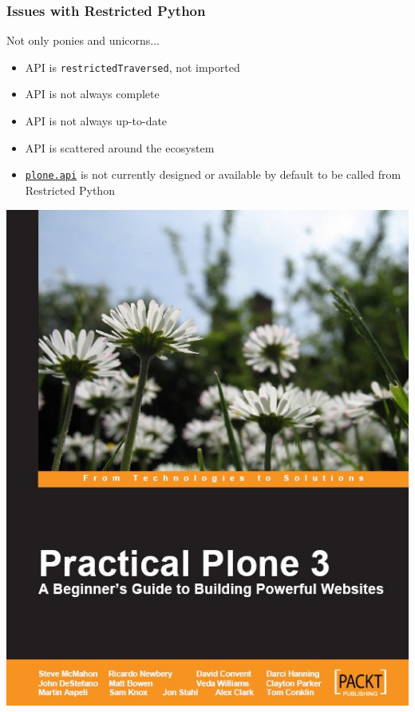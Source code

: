 \documentclass[aspectratio=43]{beamer}
\begin{document}
\begin{frame}[plain,t]
  \frametitle{Issues with Restricted Python}
  \par
  Not only ponies and unicorns...
  \par
  \vspace{0.33cm}
  \begin{itemize}[<+->]
  \setlength{\itemsep}{1em}
  \item API is \texttt{restrictedTraversed}, not imported
  \item API is not always complete
  \item API is not always up-to-date
  \item API is scattered around the ecosystem
  \item \href{https://api.plone.org/}{\texttt{plone.api}} is not currently designed or available by default to be called from Restricted Python
  \end{itemize}
\end{frame}

\begin{frame}[plain,c]
\centering\includegraphics[trim=0 0 0 0,clip,width=0.5\paperwidth,]{images/practical-plone.jpg}
\end{frame}
\end{document}
